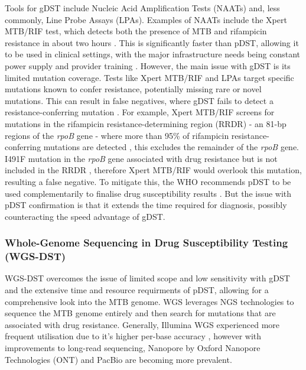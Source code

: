 Tools for gDST include Nucleic Acid Amplification Tests (NAATs) and, less commonly, Line Probe Assays (LPAs). Examples of NAATs include the Xpert MTB/RIF test, which detects both the presence of MTB and rifampicin resistance in about two hours \cite{iram2015rapid}. This is significantly faster than pDST, allowing it to be used in clinical settings, with the major infrastructure needs being constant power supply and provider training \cite{whitney2016}. However, the main issue with gDST is its limited mutation coverage. Tests like Xpert MTB/RIF and LPAs target specific mutations known to confer resistance, potentially missing rare or novel mutations. This can result in false negatives, where gDST fails to detect a resistance-conferring mutation \cite{Yusoof2022}. For example, Xpert MTB/RIF screens for mutations in the rifampicin resistance-determining region (RRDR) -  an 81-bp regions of the \textit{rpoB} gene - where more than 95\% of rifampicin resistance-conferring mutations are detected \cite{rahman2016comparison,musser1995antimicrobial}, this excludes the remainder of the \textit{rpoB} gene.  I491F mutation in the \textit{rpoB} gene associated with drug resistance but is not included in the RRDR \cite{mon2022first}, therefore Xpert MTB/RIF would overlook this mutation, resulting a false negative. To mitigate this, the WHO recommends pDST to be used complementarily to finalise drug susceptibility results \cite{Yusoof2022, whoguide2022}. But the issue with pDST confirmation is that it extends the time required for diagnosis, possibly counteracting the speed advantage of gDST.

\subsubsection{Whole-Genome Sequencing in Drug Susceptibility Testing (WGS-DST)}

WGS-DST overcomes the issue of limited scope and low sensitivity with gDST and the extensive time and resource requirments of pDST, allowing for a comprehensive look into the MTB genome. WGS leverages NGS technologies to sequence the MTB genome entirely and then search for mutations that are associated with drug resistance. Generally,  Illumina WGS experienced more frequent utilisation due to it's higher per-base accuracy \cite{marin2022benchmarking}, however with improvements to long-read sequencing, Nanopore by Oxford Nanopore Technologies (ONT) \cite{hall2023evaluation, smith2020assessing} and PacBio \cite{meehan2018} are becoming more prevalent.

